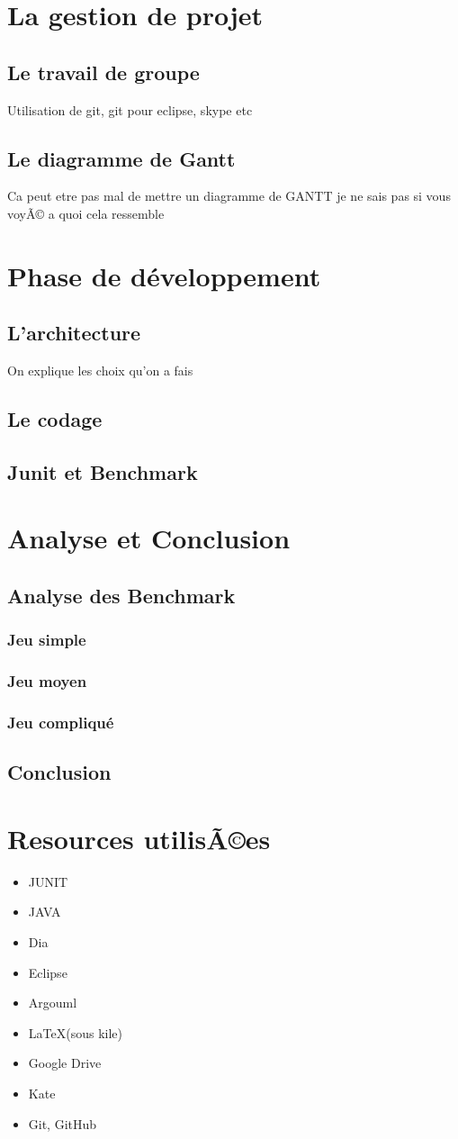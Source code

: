 \documentclass[a4paper,twoside,12pt]{report}
\begin{document}
\chapter{La gestion de projet}
%
\section{Le travail de groupe}
%
Utilisation de git, git pour eclipse, skype etc
\section{Le diagramme de Gantt}
%
Ca peut etre pas mal de mettre un diagramme de GANTT je ne sais pas si vous voyÃ© a quoi cela ressemble
\chapter{Phase de développement}
%
\section{L'architecture}
On explique les choix qu'on a fais
\section{Le codage}
%
\section{Junit et Benchmark}
%
\chapter{Analyse et Conclusion}
%
\section{Analyse des Benchmark}
%
\subsection{Jeu simple}
%
\subsection{Jeu moyen}
%
\subsection{Jeu compliqué}
%
\section{Conclusion}
%
\newpage
{}


\chapter{Resources utilisÃ©es}
\begin{itemize}
 \item JUNIT
 \item JAVA
 \item Dia
 \item Eclipse
 \item Argouml
 \item \LaTeX (sous kile)
 \item Google Drive
 \item Kate
 \item Git, GitHub
\end{itemize}
\end{document}
